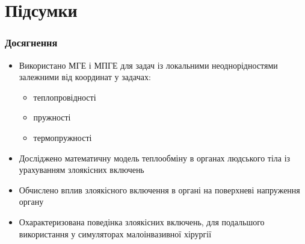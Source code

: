 \documentclass{beamer}
\begin{document}
\section{Підсумки}

\begin{frame}
    \frametitle{Досягнення}
    \begin{itemize}
        \item Використано МГЕ і МПГЕ для задач із локальними неоднорідностями залежними від координат у задачах:
              \begin{itemize}
                  \item теплопровідності
                  \item пружності
                  \item термопружності
              \end{itemize}
        \item Досліджено математичну модель теплообміну в органах людського тіла із урахуванням злоякісних включень
        \item Обчислено вплив злоякісного включення в органі на поверхневі напруження органу
        \item Охарактеризована поведінка злоякісних включень, для подальшого використання у симуляторах малоінвазивної
              хірургії
    \end{itemize}
\end{frame}
\end{document}
